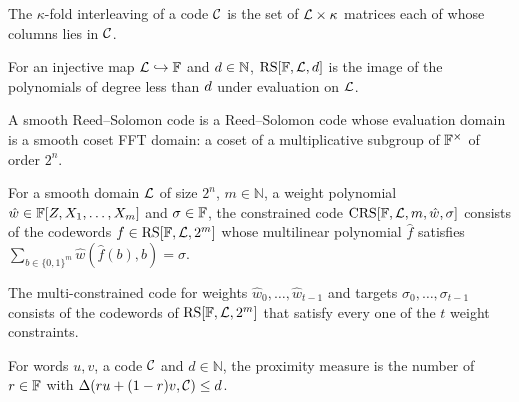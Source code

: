 \begin{definition}
    \label{def:interleaved_code}
    \leanok
    The $\kappa$-fold interleaving of a code $\mathcal{C}$ is the set of
    $\mathcal{L}\times\kappa$ matrices each of whose columns lies in $\mathcal{C}$.
\end{definition}

\begin{definition}
    \label{def:reed_solomon_code}
    \leanok
    For an injective map $\mathcal{L}\hookrightarrow\mathbb{F}$ and $d\in\mathbb{N}$,
    $\mathrm{RS}[\mathbb{F},\mathcal{L},d]$ is the image of the polynomials of degree less than
    $d$ under evaluation on $\mathcal{L}$.
\end{definition}

\begin{definition}
    \label{def:smooth_rs_code}
    \leanok
    A smooth Reed--Solomon code is a Reed--Solomon code whose evaluation domain is a smooth coset
    FFT domain: a coset of a multiplicative subgroup of $\mathbb{F}^\times$ of order $2^n$.
\end{definition}

\begin{definition}
    \label{def:constrained_code}
    \leanok
    For a smooth domain $\mathcal{L}$ of size $2^n$, $m\in\mathbb{N}$, a weight polynomial
    $\hat{w}\in\mathbb{F}[Z,X_1,\ldots,X_m]$ and $\sigma\in\mathbb{F}$, the constrained code
    $\mathrm{CRS}[\mathbb{F},\mathcal{L},m,\hat{w},\sigma]$ consists of the codewords
    $f\in\mathrm{RS}[\mathbb{F},\mathcal{L},2^m]$ whose multilinear polynomial $\hat{f}$ satisfies
    $\sum_{b\in\{0,1\}^m}\hat{w}(\hat{f}(b),b)=\sigma$.
\end{definition}

\begin{definition}
    \label{def:multi_constrained_code}
    \leanok
    The multi-constrained code for weights $\hat{w}_0,\ldots,\hat{w}_{t-1}$ and targets
    $\sigma_0,\ldots,\sigma_{t-1}$ consists of the codewords of $\mathrm{RS}[\mathbb{F},\mathcal{L},2^m]$
    that satisfy every one of the $t$ weight constraints.
\end{definition}

\begin{definition}
    \label{def:proximity_measure}
    \leanok
    For words $u,v$, a code $\mathcal{C}$ and $d\in\mathbb{N}$, the proximity measure is the number of
    $r\in\mathbb{F}$ with $\Delta(r u+(1-r)v,\mathcal{C})\le d$.
\end{definition}

